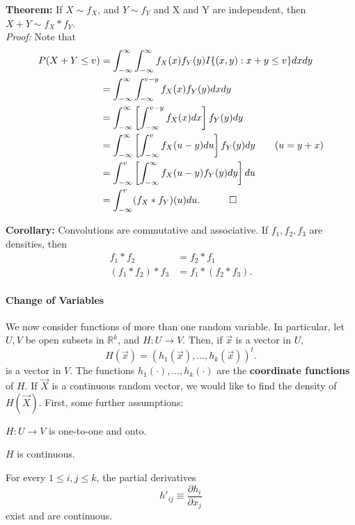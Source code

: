 \documentclass[12pt,oneside]{article}
\begin{document}
\noindent \textbf{Theorem:}  If $X \sim f_X$, and $Y \sim f_Y$ and X and Y are independent, then $X+Y \sim f_X \ast f_Y$.\\

\noindent \emph{Proof:} Note that
\begin{align*}
P(X+Y \leq v) &= \int_{-\infty}^\infty  \int_{-\infty}^\infty  f_X(x) f_Y(y)  I\{ (x,y):x+y \leq v \} dx dy \\
&= \int_{-\infty}^\infty \int_{-\infty}^{v-y} f_X(x)f_Y(y)dxdy  \\
&=  \int_{-\infty}^\infty\left[ \int_{-\infty}^{v-y} f_X(x) dx\right] f_Y(y) dy \\
&= \int_{-\infty}^\infty \left[ \int_{-\infty}^{v} f_X (u-y) du\right] f_Y(y) dy \hspace{20 pt} (u = y+x) \\
&= \int_{-\infty}^v \left[\int_{-\infty}^{\infty} f_X(u-y)f_Y(y)dy\right]du \\
&= \int_{-\infty}^v (f_X \ast f_Y)(u) du . \hspace{30 pt}\Box
\end{align*}

\noindent \textbf{Corollary:} Convolutions are commutative and associative.  If $f_1,f_2,f_3$ are densities, then
\begin{align*}
f_1 \ast f_2 &= f_2 \ast f_1 \\
(f_1 \ast f_2) \ast f_3 &= f_1 \ast (f_2 \ast f_3).
\end{align*}


\paragraph{Change of Variables}
We now consider functions of more than one random variable.  In particular, let $U,V$ be open subsets in $\mathbb{R}^k$, and $H: U \rightarrow V$.  Then, if $\vec{x}$ is a vector in $U$,  \[ H(\vec{x}) = (h_1(\vec{x}) , \hdots,h_k(\vec{x}))^t. \]
is a vector in $V$.  The functions $h_1(\cdot), \hdots,h_k(\cdot)$ are the \textbf{coordinate functions} of $H$.  If $\vec{X}$ is a continuous random vector, we would like to find the density of $H(\vec{X})$. First, some further assumptions:

\begin{Assumptions}
\item $H: U \rightarrow V$ is one-to-one and onto.
\item $H$ is continuous.
\item For every $1 \leq i,j \leq k$, the partial derivatives \[h'_{ij} \equiv \frac{\partial h_i}{\partial x_j}\] exist and are continuous.
\end{Assumptions}
\end{document}
